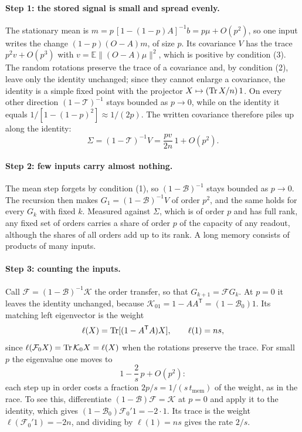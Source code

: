 \paragraph{Step 1: the stored signal is small and spread evenly.}
The stationary mean is $m=p\,[1-(1-p)A]^{-1}b=p\mu+O(p^2)$, so one input writes the change $(1-p)(O-A)m$, of size
$p$. Its covariance $V$ has the trace $p^2v+O(p^3)$ with $v=\mathbb E\|(O-A)\mu\|^2$, which is positive by
condition (3). The random rotations preserve the trace of a covariance and, by condition (2), leave only the identity
unchanged; since they cannot enlarge a covariance, the identity is a simple fixed point with the projector
$X\mapsto(\operatorname{Tr} X/n)\,1$. On every other direction $(1-\mathcal T)^{-1}$ stays bounded as $p\to0$, while on the identity
it equals $1/[1-(1-p)^2]\approx1/(2p)$. The written covariance therefore piles up along the identity:
\begin{equation}
  \Sigma=(1-\mathcal T)^{-1}V=\frac{pv}{2n}\,1+O(p^2).
  \label{eq:slowcov}
\end{equation}

\paragraph{Step 2: few inputs carry almost nothing.}
The mean step forgets by condition (1), so $(1-\mathcal B)^{-1}$ stays bounded as $p\to0$. The recursion then makes
$G_1=(1-\mathcal B)^{-1}V$ of order $p^2$, and the same holds for every $G_k$ with fixed $k$. Measured against
$\Sigma$, which is of order $p$ and has full rank, any fixed set of orders carries a share of order $p$ of the
capacity of any readout, although the shares of all orders add up to its rank. A long memory consists of products of many
inputs.

\paragraph{Step 3: counting the inputs.}
Call $\mathcal F=(1-\mathcal B)^{-1}\mathcal K$ the order transfer, so that $G_{k+1}=\mathcal FG_k$. At $p=0$ it
leaves the identity unchanged, because $\mathcal K_01=1-AA^{\mathsf T}=(1-\mathcal B_0)1$. Its matching left
eigenvector is the weight
\begin{equation}
  \ell(X)=\operatorname{Tr}[(1-A^{\mathsf T}A)X],\qquad \ell(1)=ns ,
  \label{eq:weight}
\end{equation}
since $\ell(\mathcal F_0X)=\operatorname{Tr}\mathcal K_0X=\ell(X)$ when the rotations preserve the trace. For small $p$ the
eigenvalue one moves to
\begin{equation}
  1-\frac{2}{s}\,p+O(p^2):
  \label{eq:ordereig}
\end{equation}
each step up in order costs a fraction $2p/s=1/(s\,t_{\mathrm{mem}})$ of the weight, as in the race. To see this,
differentiate $(1-\mathcal B)\mathcal F=\mathcal K$ at $p=0$ and apply it to the identity, which gives
$(1-\mathcal B_0)\mathcal F_0'1=-2\cdot1$. Its trace is the weight $\ell(\mathcal F_0'1)=-2n$, and dividing by
$\ell(1)=ns$ gives the rate $2/s$.

